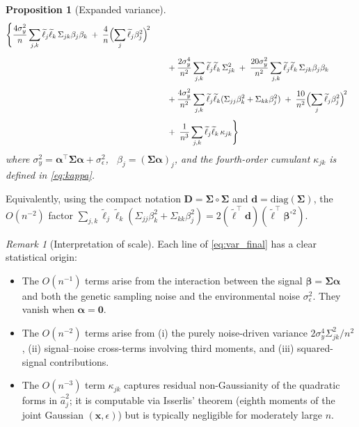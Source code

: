 \documentclass[11pt]{article}
\newcommand{\bSig}{\boldsymbol{\Sigma}}
\newcommand{\balpha}{\boldsymbol{\alpha}}
\newcommand{\bbeta}{\boldsymbol{\beta}}
\newcommand{\bx}{\mathbf{x}}
\theoremstyle{plain}
\newtheorem{proposition}[theorem]{Proposition}
\theoremstyle{definition}
\theoremstyle{remark}
\newtheorem{remark}[theorem]{Remark}
\begin{document}
\begin{proposition}[Expanded variance]
\begin{align}
{\begin{aligned}
    \Biggl\{
    \frac{4\sigma_y^2}{n}
      \sum_{j,k}\widetilde\ell_j\widetilde\ell_k\,
        \Sigma_{jk}\beta_j\beta_k
    \;+\;
    \frac{4}{n}
      \Bigl(\sum_j\widetilde\ell_j\beta_j^2\Bigr)^{\!2}
    \\[6pt]
    &\qquad
    +\frac{2\sigma_y^4}{n^2}
      \sum_{j,k}\widetilde\ell_j\widetilde\ell_k\,\Sigma_{jk}^2
    \;+\;
    \frac{20\sigma_y^2}{n^2}
      \sum_{j,k}\widetilde\ell_j\widetilde\ell_k\,
        \Sigma_{jk}\beta_j\beta_k
    \\[4pt]
    &\qquad
    +\frac{4\sigma_y^2}{n^2}
      \sum_{j,k}\widetilde\ell_j\widetilde\ell_k
        (\Sigma_{jj}\beta_k^2+\Sigma_{kk}\beta_j^2)
    \;+\;
    \frac{10}{n^2}
      \Bigl(\sum_j\widetilde\ell_j\beta_j^2\Bigr)^{\!2}
    \\[4pt]
    &\qquad
    +\;\frac{1}{n^3}
      \sum_{j,k}\widetilde\ell_j\widetilde\ell_k\,\kappa_{jk}
    \Biggr\}
\end{aligned}
}
\label{eq:var_final}
\end{align}
where $\sigma_y^2=\balpha^\top\bSig\balpha+\sigma_\epsilon^2$, \ 
$\beta_j=(\bSig\balpha)_j$, and the fourth-order
cumulant $\kappa_{jk}$ is defined in \eqref{eq:kappa}.
\end{proposition}

\medskip

Equivalently, using the compact notation
$\mathbf{D}=\bSig\circ\bSig$ and
$\mathbf{d}=\mathrm{diag}(\bSig)$,
the $O(n^{-2})$ factor
$\sum_{j,k}\widetilde\ell_j\widetilde\ell_k
(\Sigma_{jj}\beta_k^2+\Sigma_{kk}\beta_j^2)
= 2(\widetilde{\boldsymbol\ell}^\top\mathbf{d})
   (\widetilde{\boldsymbol\ell}^\top\bbeta^{\circ 2})$.

\begin{remark}[Interpretation of scale]
Each line of \eqref{eq:var_final} has a clear statistical origin:
\begin{itemize}
\item The $O(n^{-1})$ terms arise from the interaction between
      the signal $\bbeta=\bSig\balpha$ and both the genetic
      sampling noise and the environmental noise $\sigma_\epsilon^2$.
      They vanish when $\balpha=\mathbf{0}$.
\item The $O(n^{-2})$ terms arise from (i) the purely noise-driven
      variance $2\sigma_y^4\Sigma_{jk}^2/n^2$, (ii) signal--noise
      cross-terms involving third moments, and (iii) squared-signal
      contributions.
\item The $O(n^{-3})$ term $\kappa_{jk}$ captures residual
      non-Gaussianity of the quadratic forms in $\widehat{a}_j^2$;
      it is computable via Isserlis' theorem (eighth moments of
      the joint Gaussian $(\bx,\epsilon)$) but is typically
      negligible for moderately large $n$.
\end{itemize}
\end{remark}
\end{document}
